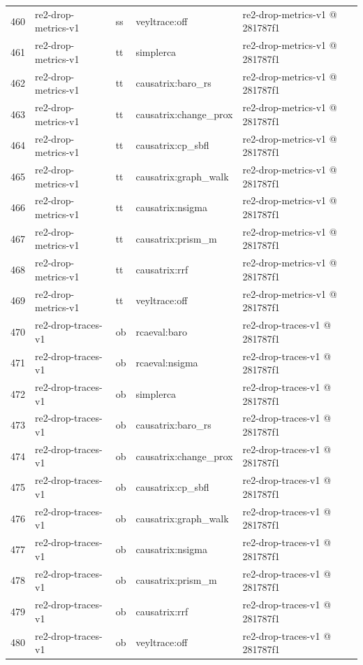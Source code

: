 \begin{longtable}{@{}r>{\raggedright\arraybackslash}p{87.0pt}>{\raggedright\arraybackslash}p{18.0pt}>{\raggedright\arraybackslash}p{63.0pt}>{\raggedright\arraybackslash}p{108.0pt}@{}}
460 & re2-drop-metrics-v1 & ss & veyltrace:off & re2-drop-metrics-v1 @ 281787f1 \\
461 & re2-drop-metrics-v1 & tt & simplerca & re2-drop-metrics-v1 @ 281787f1 \\
462 & re2-drop-metrics-v1 & tt & causatrix:baro\_rs & re2-drop-metrics-v1 @ 281787f1 \\
463 & re2-drop-metrics-v1 & tt & causatrix:change\_prox & re2-drop-metrics-v1 @ 281787f1 \\
464 & re2-drop-metrics-v1 & tt & causatrix:cp\_sbfl & re2-drop-metrics-v1 @ 281787f1 \\
465 & re2-drop-metrics-v1 & tt & causatrix:graph\_walk & re2-drop-metrics-v1 @ 281787f1 \\
466 & re2-drop-metrics-v1 & tt & causatrix:nsigma & re2-drop-metrics-v1 @ 281787f1 \\
467 & re2-drop-metrics-v1 & tt & causatrix:prism\_m & re2-drop-metrics-v1 @ 281787f1 \\
468 & re2-drop-metrics-v1 & tt & causatrix:rrf & re2-drop-metrics-v1 @ 281787f1 \\
469 & re2-drop-metrics-v1 & tt & veyltrace:off & re2-drop-metrics-v1 @ 281787f1 \\
470 & re2-drop-traces-v1 & ob & rcaeval:baro & re2-drop-traces-v1 @ 281787f1 \\
471 & re2-drop-traces-v1 & ob & rcaeval:nsigma & re2-drop-traces-v1 @ 281787f1 \\
472 & re2-drop-traces-v1 & ob & simplerca & re2-drop-traces-v1 @ 281787f1 \\
473 & re2-drop-traces-v1 & ob & causatrix:baro\_rs & re2-drop-traces-v1 @ 281787f1 \\
474 & re2-drop-traces-v1 & ob & causatrix:change\_prox & re2-drop-traces-v1 @ 281787f1 \\
475 & re2-drop-traces-v1 & ob & causatrix:cp\_sbfl & re2-drop-traces-v1 @ 281787f1 \\
476 & re2-drop-traces-v1 & ob & causatrix:graph\_walk & re2-drop-traces-v1 @ 281787f1 \\
477 & re2-drop-traces-v1 & ob & causatrix:nsigma & re2-drop-traces-v1 @ 281787f1 \\
478 & re2-drop-traces-v1 & ob & causatrix:prism\_m & re2-drop-traces-v1 @ 281787f1 \\
479 & re2-drop-traces-v1 & ob & causatrix:rrf & re2-drop-traces-v1 @ 281787f1 \\
480 & re2-drop-traces-v1 & ob & veyltrace:off & re2-drop-traces-v1 @ 281787f1 \\

\end{longtable}

